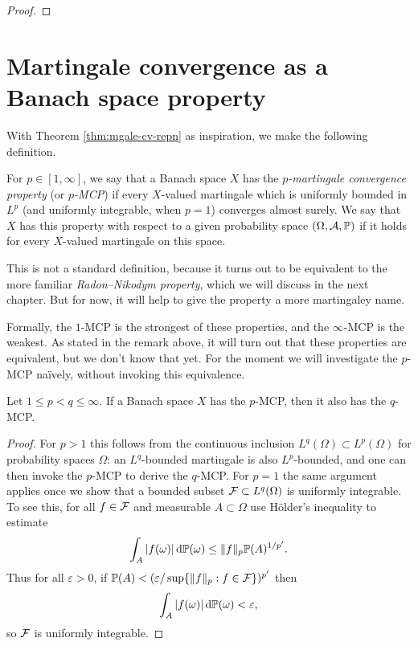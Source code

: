 \begin{proof}
\end{proof}

\section{Martingale convergence as a Banach space property}

With Theorem \ref{thm:mgale-cv-repn} as inspiration, we make the following definition.

\begin{defn}
  For $p \in [1,\infty]$, we say that a Banach space $X$ has the \emph{$p$-martingale convergence property} (or \emph{$p$-MCP}) if every $X$-valued martingale which is uniformly bounded in $L^p$ (and uniformly integrable, when $p=1$) converges almost surely.
  We say that $X$ has this property with respect to a given probability space $(\Omega,\mathcal{A},\mathbb{P})$ if it holds for every $X$-valued martingale on this space.
\end{defn}

\begin{rmk}
  This is not a standard definition, because it turns out to be equivalent to the more familiar \emph{Radon--Nikodym property}, which we will discuss in the next chapter. But for now, it will help to give the property a more martingaley name.
\end{rmk}

Formally, the $1$-MCP is the strongest of these properties, and the $\infty$-MCP is the weakest.
As stated in the remark above, it will turn out that these properties are equivalent, but we don't know that yet.
For the moment we will investigate the $p$-MCP na\"ively, without invoking this equivalence.

\begin{prop}
  Let $1 \leq p < q \leq \infty$.
  If a Banach space $X$ has the $p$-MCP, then it also has the $q$-MCP.
\end{prop}

\begin{proof}
  For $p > 1$ this follows from the continuous inclusion $L^q(\Omega) \subset L^p(\Omega)$ for probability spaces $\Omega$: an $L^q$-bounded martingale is also $L^p$-bounded, and one can then invoke the $p$-MCP to derive the $q$-MCP.
  For $p = 1$ the same argument applies once we show that a bounded subset $\mathcal{F} \subset L^q(\Omega)$ is uniformly integrable.
  To see this, for all $f \in \mathcal{F}$ and measurable $A \subset \Omega$ use H\"older's inequality to estimate
  \begin{equation*}
    \int_{A} |f(\omega)| \, \mathrm{d}\mathbb{P}(\omega) \leq \|f\|_{p} \mathbb{P}(A)^{1/p'}.
  \end{equation*}
  Thus for all $\varepsilon > 0$, if $\mathbb{P}(A) < (\varepsilon/\sup\{\|f\|_p : f \in \mathcal{F}\})^{p'}$ then
  \begin{equation*}
    \int_{A} |f(\omega)| \, \mathrm{d}\mathbb{P}(\omega) < \varepsilon,
  \end{equation*}
  so $\mathcal{F}$ is uniformly integrable.
  
\end{proof}


